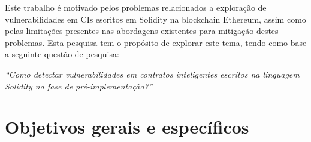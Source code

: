 Este trabalho é motivado pelos problemas relacionados a exploração de vulnerabilidades em CIs escritos em Solidity na blockchain Ethereum, assim como pelas limitações presentes nas abordagens existentes para mitigação destes problemas. Esta pesquisa tem o propósito de explorar este tema, tendo como base a seguinte questão de pesquisa:

\textit{``Como detectar vulnerabilidades em contratos inteligentes escritos na linguagem Solidity na fase de pré-implementação?''}






\section{Objetivos gerais e específicos}

